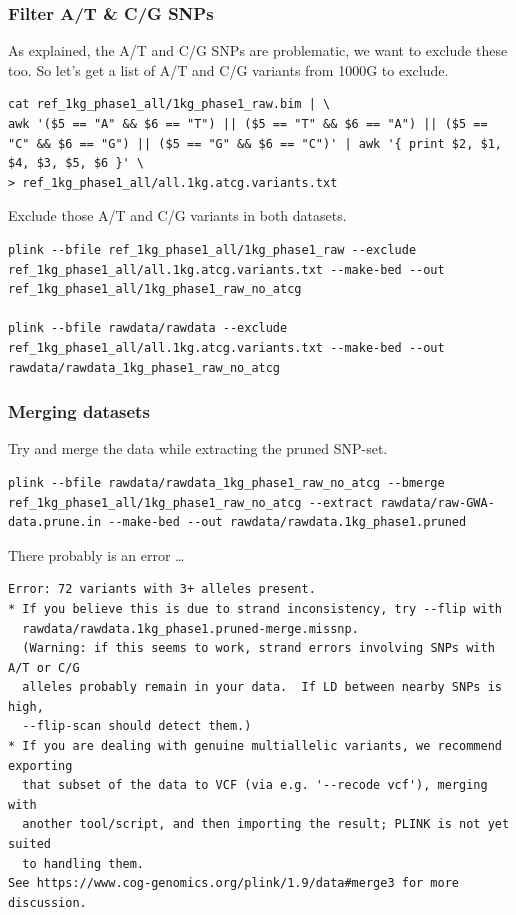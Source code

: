 \documentclass[
]{book}
\begin{document}
\hypertarget{filter-at-cg-snps}{%
\subsubsection{Filter A/T \& C/G SNPs}\label{filter-at-cg-snps}}

As explained, the A/T and C/G SNPs are problematic, we want to exclude these too. So let's get a list of A/T and C/G variants from 1000G to exclude.

\begin{verbatim}
cat ref_1kg_phase1_all/1kg_phase1_raw.bim | \
awk '($5 == "A" && $6 == "T") || ($5 == "T" && $6 == "A") || ($5 == "C" && $6 == "G") || ($5 == "G" && $6 == "C")' | awk '{ print $2, $1, $4, $3, $5, $6 }' \
> ref_1kg_phase1_all/all.1kg.atcg.variants.txt
\end{verbatim}

Exclude those A/T and C/G variants in both datasets.

\begin{verbatim}
plink --bfile ref_1kg_phase1_all/1kg_phase1_raw --exclude ref_1kg_phase1_all/all.1kg.atcg.variants.txt --make-bed --out ref_1kg_phase1_all/1kg_phase1_raw_no_atcg

plink --bfile rawdata/rawdata --exclude ref_1kg_phase1_all/all.1kg.atcg.variants.txt --make-bed --out rawdata/rawdata_1kg_phase1_raw_no_atcg
\end{verbatim}

\hypertarget{merging-datasets-1}{%
\subsubsection{Merging datasets}\label{merging-datasets-1}}

Try and merge the data while extracting the pruned SNP-set.

\begin{verbatim}
plink --bfile rawdata/rawdata_1kg_phase1_raw_no_atcg --bmerge ref_1kg_phase1_all/1kg_phase1_raw_no_atcg --extract rawdata/raw-GWA-data.prune.in --make-bed --out rawdata/rawdata.1kg_phase1.pruned
\end{verbatim}

There probably is an error \ldots{}

\begin{verbatim}
Error: 72 variants with 3+ alleles present.
* If you believe this is due to strand inconsistency, try --flip with
  rawdata/rawdata.1kg_phase1.pruned-merge.missnp.
  (Warning: if this seems to work, strand errors involving SNPs with A/T or C/G
  alleles probably remain in your data.  If LD between nearby SNPs is high,
  --flip-scan should detect them.)
* If you are dealing with genuine multiallelic variants, we recommend exporting
  that subset of the data to VCF (via e.g. '--recode vcf'), merging with
  another tool/script, and then importing the result; PLINK is not yet suited
  to handling them.
See https://www.cog-genomics.org/plink/1.9/data#merge3 for more discussion.
\end{verbatim}
\end{document}
